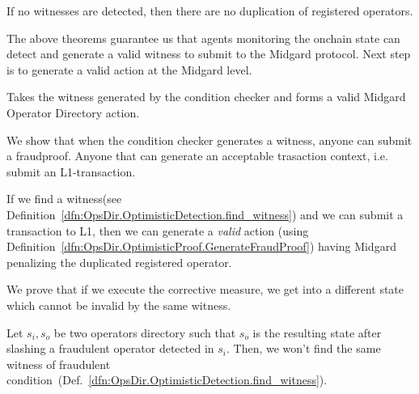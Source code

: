   
\begin{theorem}
  \label{thm:OpsDir.OptimisticDetection.not_finding_witness}
  \leanok
  If no witnesses are detected, then there are no duplication of registered operators.
  \end{theorem}

The above theorems guarantee us that agents monitoring the onchain state can
detect and generate a valid witness to submit to the Midgard protocol.
%
Next step is to generate a valid action at the Midgard level.

\begin{definition}
  \label{dfn:OpsDir.OptimisticProof.GenerateFraudProof}
  \leanok
  Takes the witness generated by the condition checker and forms a valid Midgard Operator Directory action.
  \end{definition}

We show that when the condition checker generates a witness,
anyone can submit a fraudproof.
%
Anyone that can generate an acceptable trasaction context, i.e. submit an
L1-transaction.

\begin{theorem}
  \label{thm:OpsDir.OptimisticProof.EnabledFPSubmission}
  \leanok
  If we find a witness(see Definition~\ref{dfn:OpsDir.OptimisticDetection.find_witness}) and we can submit a
transaction to L1, then we can generate a \emph{valid} action
(using Definition~\ref{dfn:OpsDir.OptimisticProof.GenerateFraudProof}) having
Midgard penalizing the duplicated registered operator.
  \end{theorem}

We prove that if we execute the corrective measure, we get into a
different state which cannot be invalid by the same witness.
%

\begin{theorem}
  \label{thm:OpsDir.OptimisticProof.AfterFP}
  \leanok
  Let \(s_{i},s_{o}\) be two operators directory such that
  \(s_{o}\) is the resulting state after slashing a fraudulent operator detected in \(s_{i}\).
  Then, we won't find the same witness of fraudulent
condition~(Def.~\ref{dfn:OpsDir.OptimisticDetection.find_witness}).
  \end{theorem}

